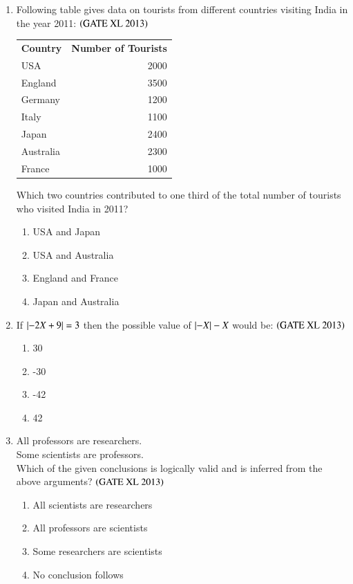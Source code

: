 \documentclass[journal]{IEEEtran}
\begin{document}
\begin{enumerate}
\item  
Following table gives data on tourists from different countries visiting India in the year 2011: \hfill $\left(\text{GATE XL 2013}\right)$
\begin{center}
\begin{tabular}{|l|r|}

\textbf{Country} & \textbf{Number of Tourists} \\

USA & 2000 \\
England & 3500 \\
Germany & 1200 \\
Italy & 1100 \\
Japan & 2400 \\
Australia & 2300 \\
France & 1000 \\

\end{tabular}
\end{center}
Which two countries contributed to one third of the total number of tourists who visited India in 2011?
\begin{enumerate}
    \item USA and Japan
    \item USA and Australia
    \item England and France
    \item Japan and Australia
\end{enumerate}

\item  
If $\left\vert-2X + 9\right\vert = 3$ then the possible value of $\left\vert-X\right\vert - X$ would be: \hfill $\left(\text{GATE XL 2013}\right)$
\begin{enumerate}
    \item 30
    \item -30
    \item -42
    \item 42
\end{enumerate}

\item  
All professors are researchers.\\
Some scientists are professors.\\
Which of the given conclusions is logically valid and is inferred from the above arguments? \hfill $\left(\text{GATE XL 2013}\right)$
\begin{enumerate}
    \item All scientists are researchers
    \item All professors are scientists
    \item Some researchers are scientists
    \item No conclusion follows
\end{enumerate}


\end{enumerate}
\end{document}
